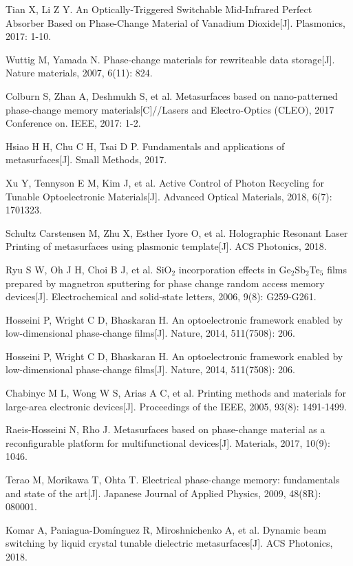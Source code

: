 \begin{thebibliography}{99}
 Tian X, Li Z Y. An Optically-Triggered Switchable Mid-Infrared Perfect Absorber Based on Phase-Change Material of Vanadium Dioxide[J]. Plasmonics, 2017: 1-10.

 Wuttig M, Yamada N. Phase-change materials for rewriteable data storage[J]. Nature materials, 2007, 6(11): 824.

 Colburn S, Zhan A, Deshmukh S, et al. Metasurfaces based on nano-patterned phase-change memory materials[C]//Lasers and Electro-Optics (CLEO), 2017 Conference on. IEEE, 2017: 1-2.

 Hsiao H H, Chu C H, Tsai D P. Fundamentals and applications of metasurfaces[J]. Small Methods, 2017.

 Xu Y, Tennyson E M, Kim J, et al. Active Control of Photon Recycling for Tunable Optoelectronic Materials[J]. Advanced Optical Materials, 2018, 6(7): 1701323.

 Schultz Carstensen M, Zhu X, Esther Iyore O, et al. Holographic Resonant Laser Printing of metasurfaces using plasmonic template[J]. ACS Photonics, 2018.

 Ryu S W, Oh J H, Choi B J, et al. SiO$_{2}$ incorporation effects in Ge$_{2}$Sb$_{2}$Te$_{5}$ films prepared by magnetron sputtering for phase change random access memory devices[J]. Electrochemical and solid-state letters, 2006, 9(8): G259-G261.

 Hosseini P, Wright C D, Bhaskaran H. An optoelectronic framework enabled by low-dimensional phase-change films[J]. Nature, 2014, 511(7508): 206.

 Hosseini P, Wright C D, Bhaskaran H. An optoelectronic framework enabled by low-dimensional phase-change films[J]. Nature, 2014, 511(7508): 206.

 Chabinyc M L, Wong W S, Arias A C, et al. Printing methods and materials for large-area electronic devices[J]. Proceedings of the IEEE, 2005, 93(8): 1491-1499.

 Raeis-Hosseini N, Rho J. Metasurfaces based on phase-change material as a reconfigurable platform for multifunctional devices[J]. Materials, 2017, 10(9): 1046.

 Terao M, Morikawa T, Ohta T. Electrical phase-change memory: fundamentals and state of the art[J]. Japanese Journal of Applied Physics, 2009, 48(8R): 080001.

 Komar A, Paniagua-Domínguez R, Miroshnichenko A, et al. Dynamic beam switching by liquid crystal tunable dielectric metasurfaces[J]. ACS Photonics, 2018.


\end{thebibliography}
